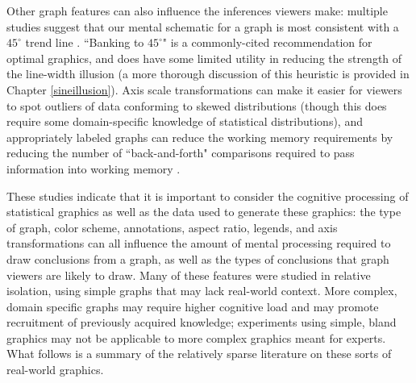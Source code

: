 \documentclass[11pt]{isuthesis}\usepackage[]{graphicx}\usepackage[]{color}
\begin{document}
Other graph features can also influence the inferences viewers make: multiple studies suggest that our mental schematic for a graph is most consistent with a $45^\circ$ trend line \citep{cleveland:88, tversky1989perceptual}. ``Banking to $45^\circ$" is a commonly-cited recommendation for optimal graphics, and does have some limited utility in reducing the strength of the line-width illusion (a more thorough discussion of this heuristic is provided in Chapter \ref{sineillusion}). Axis scale transformations can make it easier for viewers to spot outliers of data conforming to skewed distributions (though this does require some domain-specific knowledge of statistical distributions), and appropriately labeled graphs can reduce the working memory requirements by reducing the number of ``back-and-forth" comparisons required to pass information into working memory \citep{shah2005cambridge}. 

These studies indicate that it is important to consider the cognitive processing of statistical graphics as well as the data used to generate these graphics: the type of graph, color scheme, annotations, aspect ratio, legends, and axis transformations can all influence the amount of mental processing required to draw conclusions from a graph, as well as the types of conclusions that graph viewers are likely to draw. Many of these features were studied in relative isolation, using simple graphs that may lack real-world context. More complex, domain specific graphs may require higher cognitive load and may promote recruitment of previously acquired knowledge; experiments using simple, bland graphics may not be applicable to more complex graphics meant for experts. What follows is a summary of the relatively sparse literature on these sorts of real-world graphics. 
\end{document}
